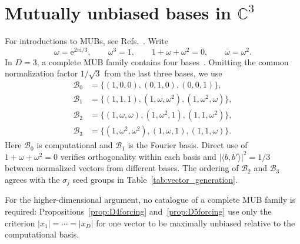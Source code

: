 \documentclass[%
  reprint,
  superscriptaddress,
  showpacs,
  showkeys,
  amsmath,amssymb,
  pra,
  longbibliography,
  floatfix,
  x11names
]{revtex4-2}
\newcommand{\ii}{\mathrm{i}}
\newenvironment{revision}{\begingroup}{\endgroup}
\begin{document}


\bigskip
\appendix

\begin{revision}
\section{Mutually unbiased bases in $\mathbb{C}^3$}
\label{appendix:MUBsD3}

For introductions to MUBs, see Refs.~\cite{Schwinger.60,WooFie,Brierley2009,springerlink:10.1007/978-3-540-24633-6_10,durt,mcnulty2024mutually}.  Write
\[
\omega=\mathrm{e}^{2\pi\ii{}/3},\qquad
\omega^3=1,\qquad 1+\omega+\omega^2=0,
\qquad \overline{\omega}=\omega^2.
\]
In $D=3$, a complete MUB family contains four bases~\cite{ivanovic-1997}.  Omitting the common normalization factor $1/\sqrt{3}$ from the last three bases, we use
\begin{align}
\mathcal{B}_0&=\{(1,0,0),(0,1,0),(0,0,1)\}, \label{eq:B0_3}\\
\mathcal{B}_1&=\{(1,1,1),(1,\omega,\omega^2),(1,\omega^2,\omega)\}, \label{eq:B1_3}\\
\mathcal{B}_2&=\{(1,\omega,\omega),(1,\omega^2,1),(1,1,\omega^2)\}, \label{eq:B2_3}\\
\mathcal{B}_3&=\{(1,\omega^2,\omega^2),(1,\omega,1),(1,1,\omega)\}. \label{eq:B3_3}
\end{align}
Here $\mathcal{B}_0$ is computational and $\mathcal{B}_1$ is the Fourier basis.  Direct use of $1+\omega+\omega^2=0$ verifies orthogonality within each basis and $|\langle b,b'\rangle|^2=1/3$ between normalized vectors from different bases.  The ordering of $\mathcal{B}_2$ and $\mathcal{B}_3$ agrees with the \ensuremath{\sigma_j} seed groups in Table~\ref{tab:vector_generation}.

For the higher-dimensional argument, no catalogue of a complete MUB family is required: Propositions~\ref{prop:D4forcing} and~\ref{prop:D5forcing} use only the criterion \ensuremath{|x_1|=\cdots=|x_D|} for one vector to be maximally unbiased relative to the computational basis.
\end{revision}
\end{document}

